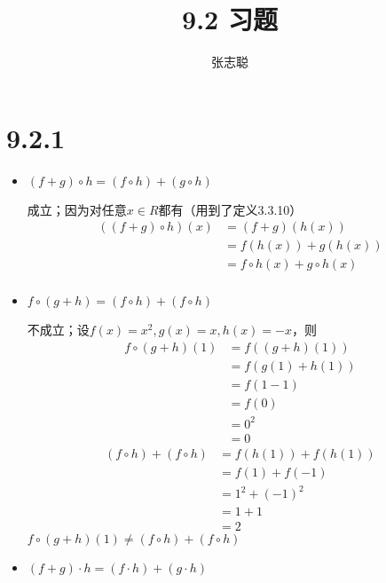 \documentclass{article}
\begin{document}
\title{9.2 习题}
\author{张志聪}
\maketitle

\section*{9.2.1}

\begin{itemize}
  \item $(f + g) \circ h = (f \circ h) + (g \circ h)$

        成立；因为对任意$x \in R$都有（用到了定义3.3.10）
        \begin{align*}
          ((f + g) \circ h)(x) & = (f + g)(h(x))               \\
                               & = f(h(x)) + g(h(x))           \\
                               & = f \circ h(x) + g \circ h(x) \\
        \end{align*}

  \item $f \circ (g + h) = (f \circ h) + (f \circ h)$

        不成立；设$f(x) = x^2, g(x)=x, h(x) = -x$，则
        \begin{align*}
          f \circ (g + h)(1) & = f((g+h)(1))    \\
                             & = f(g(1) + h(1)) \\
                             & = f(1 - 1)       \\
                             & = f(0)           \\
                             & = 0^2            \\
                             & = 0
        \end{align*}
        \begin{align*}
          (f \circ h) + (f \circ h) & = f(h(1)) + f(h(1)) \\
                                    & = f(1) + f(-1)      \\
                                    & = 1^2 + (-1)^2      \\
                                    & = 1 + 1             \\
                                    & = 2
        \end{align*}
        $f \circ (g + h)(1) \neq (f \circ h) + (f \circ h)$
  \item $(f + g) \cdot h = (f \cdot h) + (g \cdot h)$


\end{itemize}
\end{document}
